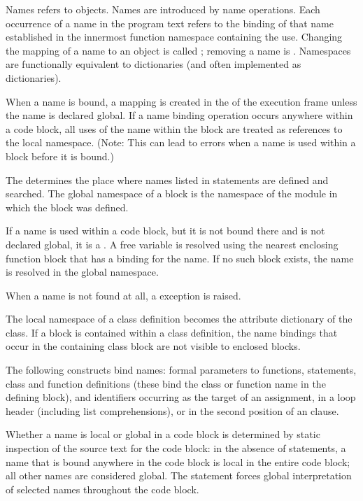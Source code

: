 Names refers to objects.  Names are introduced by name
 operations.  Each occurrence of a name
in the program text refers to the binding of that name established in
the innermost function namespace containing the use.  Changing the
mapping of a name to an object is called
; removing a name is 
.  Namespaces are functionally
equivalent to dictionaries (and often implemented as dictionaries).

When a name is bound, a mapping is created in the  of the execution frame unless the
name is declared global.  If a name binding operation occurs anywhere
within a code block, all uses of the name within the block are treated
as references to the local namespace.  (Note: This can lead to errors
when a name is used within a block before it is bound.)

The  determines the
place where names listed in 
statements are defined and searched.  The global namespace of a block
is the namespace of the module in which the block was defined.

If a name is used within a code block, but it is not bound there and
is not declared global, it is a 
.  A free variable is resolved using the
nearest enclosing function block that has a binding for the name.  If
no such block exists, the name is resolved in the global namespace.

When a name is not found at all, a
 exception is raised.

The local namespace of a class definition becomes the attribute
dictionary of the class. If a block is contained within a class
definition, the name bindings that occur in the containing class block
are not visible to enclosed blocks.

The following constructs bind names: formal parameters to functions,
 statements, class and function definitions (these bind
the class or function name in the defining block), and identifiers
occurring as the target of an assignment, in a  loop header
(including list comprehensions), or in the second position of an
 clause.

Whether a name is local or global in a code block is determined by
static inspection of the source text for the code block: in the
absence of  statements, a name that is
bound anywhere in the code block is local in the entire code block;
all other names are considered global.  The  statement
forces global interpretation of selected names throughout the code
block.

